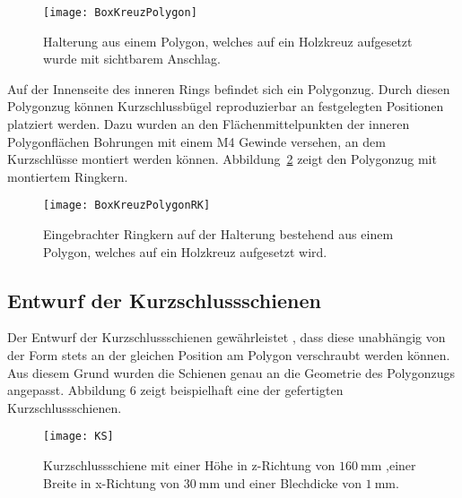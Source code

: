 \begin{figure}[htb]
	\centering
	\texttt{[image: BoxKreuzPolygon]}
	\caption{Halterung aus einem Polygon, welches auf ein Holzkreuz aufgesetzt wurde mit sichtbarem Anschlag.}
	\label{fig:BoxKreuzPolygon}
\end{figure}

Auf der Innenseite des inneren Rings befindet sich ein Polygonzug. Durch diesen Polygonzug k\"onnen Kurzschlussb\"ugel reproduzierbar an festgelegten Positionen platziert werden. Dazu wurden an den Fl\"achenmittelpunkten der inneren Polygonfl\"achen Bohrungen mit einem M4 Gewinde versehen, an dem Kurzschl\"usse montiert werden k\"onnen. Abbildung~\ref{fig:BoxKreuzPolygonRK} zeigt den Polygonzug mit montiertem Ringkern.

\begin{figure}[htb]
	\centering
	\texttt{[image: BoxKreuzPolygonRK]}
	\caption{Eingebrachter Ringkern auf der Halterung bestehend aus einem Polygon, welches auf ein Holzkreuz aufgesetzt wird.}
	\label{fig:BoxKreuzPolygonRK}
\end{figure}






\subsection{Entwurf der Kurzschlussschienen}
\label{sec:shorts}
Der Entwurf der Kurzschlussschienen gew\"ahrleistet , dass diese unabh\"angig von der Form stets an der gleichen Position am Polygon verschraubt werden k\"onnen. Aus diesem Grund wurden die Schienen genau an die Geometrie des Polygonzugs angepasst. Abbildung 6 zeigt beispielhaft eine der gefertigten Kurzschlussschienen.
\begin{figure}[htb]
	\centering
	\texttt{[image: KS]}
	\caption{Kurzschlussschiene mit einer H\"ohe in z-Richtung von $\SI{160}{\milli\meter}$ ,einer Breite in x-Richtung von $\SI{30}{\milli\meter}$ und einer Blechdicke von $\SI{1}{\milli\meter}$.}
	\label{fig:TZKS}
\end{figure}

